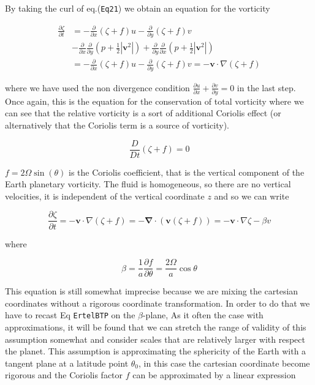 By taking the curl of eq.(\texttt{Eq21}) we obtain an equation for the
vorticity

\[\begin{aligned}
\frac{\partial \zeta}{\partial t} &= -\frac{\partial }{\partial x}(\zeta +f) u -\frac{\partial }{\partial y}(\zeta +f) v  \\
&-\frac{\partial }{\partial x} \frac{\partial }{\partial y}(p+\frac{1}{2}|\mathbf{v}^2|) +\frac{\partial }{\partial y}\frac{\partial }{\partial x}(p+\frac{1}{2}|\mathbf{v}^2|) \\
&=  -\frac{\partial }{\partial x}(\zeta +f) u -\frac{\partial }{\partial y}(\zeta +f) v = -\mathbf{v}\cdot\nabla(\zeta +f)
\end{aligned}\]

where we have used the non divergence condition
\(\frac{\partial u}{\partial x}+\frac{\partial v}{\partial y}=0\) in the
last step. Once again, this is the equation for the conservation of
total vorticity where we can see that the relative vorticity is a sort
of additional Coriolis effect (or alternatively that the Coriolis term
is a source of vorticity).

\[\frac{D}{Dt}(\zeta +f)=0\]

\(f= 2\Omega \sin(\theta)\) is the Coriolis coefficient, that is the
vertical component of the Earth planetary vorticity. The fluid is
homogeneous, so there are no vertical velocities, it is independent of
the vertical coordinate \(z\) and so we can write

\[\frac{\partial \zeta}{\partial t} = - \mathbf{v} \cdot \nabla (\zeta +f) = -\mathbf{\nabla}\cdot(\mathbf{v}(\zeta+f) )= -\mathbf{v}\cdot\nabla \zeta - \beta v\]

where

\[\beta = \frac{1}{a} \frac{\partial f}{\partial \theta} = \frac{ 2 \Omega }{a}\cos \theta\]

This equation is still somewhat imprecise because we are mixing the
cartesian coordinates without a rigorous coordinate transformation. In
order to do that we have to recast Eq \texttt{ErtelBTP} on the
\(\beta\)-plane, As it often the case with approximations, it will be
found that we can stretch the range of validity of this assumption
somewhat and consider scales that are relatively larger with respect the
planet. This assumption is approximating the sphericity of the Earth
with a tangent plane at a latitude point \(\theta_0\), in this case the
cartesian coordinate become rigorous and the Coriolis factor \(f\) can
be approximated by a linear expression

